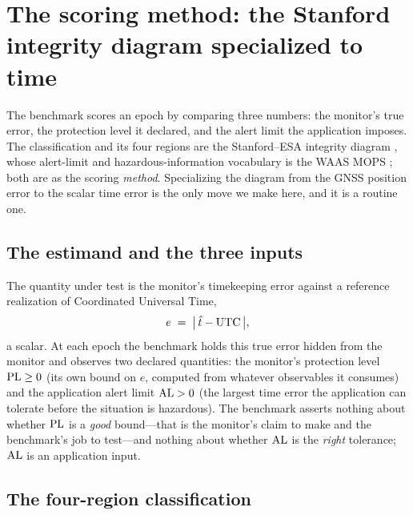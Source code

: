 \section{The scoring method: the Stanford integrity diagram specialized to time}
\label{sec:method}

The benchmark scores an epoch by comparing three numbers: the monitor's true
error, the protection level it declared, and the alert limit the application
imposes. The classification and its four regions are the Stanford--ESA integrity
diagram \citep{tossaint2007}, whose alert-limit and hazardous-information
vocabulary is the WAAS MOPS \citep{rtcado229}; both are \Cited{} as the scoring
\emph{method}. Specializing the diagram from the GNSS position error to the scalar
time error is the only move we make here, and it is a routine one.

\subsection{The estimand and the three inputs}
\label{sec:estimand}

The quantity under test is the monitor's timekeeping error against a reference
realization of Coordinated Universal Time,
\begin{equation}
  e \;=\; \big|\,\hat t - \mathrm{UTC}\,\big|,
  \label{eq:estimand}
\end{equation}
a scalar. At each epoch the benchmark holds this true error hidden from the monitor
and observes two declared quantities: the monitor's protection level $\mathrm{PL}\ge0$
(its own bound on $e$, computed from whatever observables it consumes) and the
application alert limit $\mathrm{AL}>0$ (the largest time error the application can
tolerate before the situation is hazardous). The benchmark asserts nothing about
whether $\mathrm{PL}$ is a \emph{good} bound---that is the monitor's claim to make and the
benchmark's job to test---and nothing about whether $\mathrm{AL}$ is the \emph{right}
tolerance; $\mathrm{AL}$ is an application input.

\subsection{The four-region classification}
\label{sec:classify}

